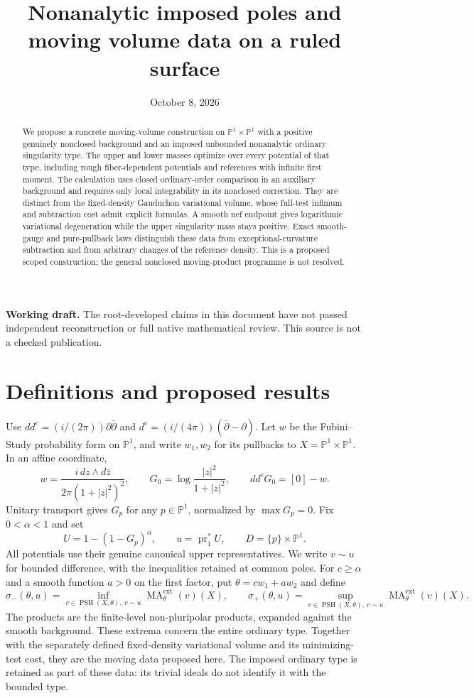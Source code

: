 \documentclass[11pt]{article}
\title{Nonanalytic imposed poles and moving volume data on a ruled surface}
\author{}
\date{October 8, 2026}
\newcommand{\ddc}{dd^c}
\newcommand{\PSH}{\operatorname{PSH}}
\newcommand{\MA}{\operatorname{MA}}
\newcommand{\ext}{\mathrm{ext}}
\newcommand{\PP}{\mathbb P}
\begin{document}
\maketitle
\noindent\textbf{Working draft.} The root-developed claims in this document
have not passed independent reconstruction or full native mathematical review.
This source is not a checked publication.

\begin{abstract}
We propose a concrete moving-volume construction on $\PP^1\times\PP^1$
with a positive genuinely nonclosed background and an imposed unbounded
nonanalytic ordinary singularity type. The upper and lower masses optimize
over every potential of that type, including rough fiber-dependent potentials
and references with infinite first moment. The calculation uses closed
ordinary-order comparison in an auxiliary background and requires only
local integrability in its nonclosed correction.
They are distinct from the fixed-density Gauduchon variational volume, whose
full-test infimum and subtraction cost admit explicit formulas. A smooth nef
endpoint gives logarithmic variational degeneration while the upper singularity
mass stays positive. Exact smooth-gauge and pure-pullback laws distinguish
these data from exceptional-curvature subtraction and from arbitrary changes
of the reference density. This is a proposed scoped construction; the general
nonclosed moving-product programme is not resolved.
\end{abstract}

\section{Definitions and proposed results}
Use $\ddc=(i/(2\pi))\partial\bar\partial$ and
$d^c=(i/(4\pi))(\bar\partial-\partial)$. Let $w$ be the Fubini--Study
probability form on $\PP^1$, and write $w_1,w_2$ for its pullbacks to
$X=\PP^1\times\PP^1$. In an affine coordinate,
\[
 w=\frac{i\,dz\wedge d\bar z}{2\pi(1+|z|^2)^2},\qquad
 G_0=\log\frac{|z|^2}{1+|z|^2},\qquad \ddc G_0=[0]-w.
\]
Unitary transport gives $G_p$ for any $p\in\PP^1$, normalized by
$\max G_p=0$. Fix $0<\alpha<1$ and set
\[
 U=1-(1-G_p)^\alpha,\qquad u=\operatorname{pr}_1^*U,
 \qquad D=\{p\}\times\PP^1.
\]
All potentials use their genuine canonical upper representatives. We write
$v\sim u$ for bounded difference, with the inequalities retained at common
poles. For $c\geq\alpha$ and a smooth function $a>0$ on the first factor,
put $\theta=cw_1+aw_2$ and define
\[
 \sigma_-(\theta,u)=\inf_{v\in\PSH(X,\theta),\ v\sim u}
              \MA^{\ext}_\theta(v)(X),\qquad
 \sigma_+(\theta,u)=\sup_{v\in\PSH(X,\theta),\ v\sim u}
              \MA^{\ext}_\theta(v)(X).
\]
The products are the finite-level non-pluripolar products, expanded against
the smooth background. These extrema concern the entire ordinary type. Together with the separately
defined fixed-density variational volume and its minimizing-test cost, they
are the moving data proposed here. The imposed ordinary type is retained
as part of these data: its trivial ideals do not identify it with the
bounded type.
\end{document}
